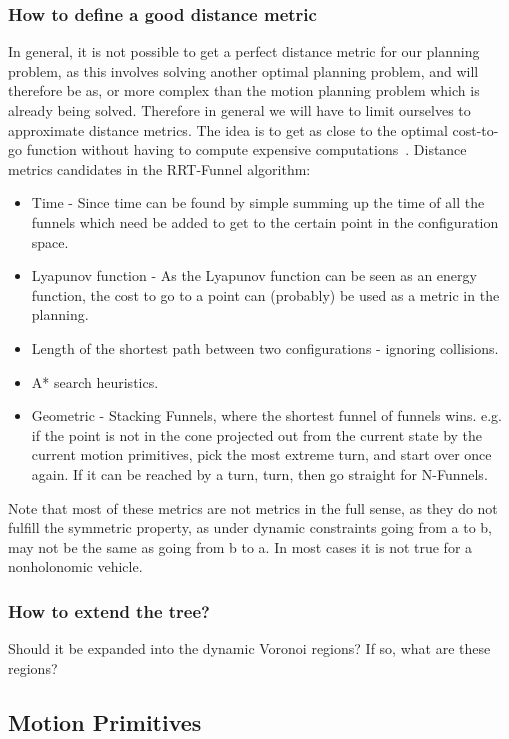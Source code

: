 \subsubsection{How to define a good distance metric}
In general, it is not possible to get a perfect distance metric for our planning
problem, as this involves solving another optimal planning problem, and will
therefore be as, or more complex than the motion planning problem which is
already being solved. Therefore in general we will have to limit ourselves to
approximate distance metrics. The idea is to get as close to the optimal
cost-to-go function without having to compute expensive computations~\cite{LaValle09}.
Distance metrics candidates in the RRT-Funnel algorithm:
\begin{itemize}
  \item Time - Since time can be found by simple summing up the time of all the
    funnels which need be added to get to the certain point in the configuration space.
  \item Lyapunov function - As the Lyapunov function can be seen as an energy
    function, the cost to go to a point can (probably) be used as a metric in
    the planning.
  \item Length of the shortest path between two configurations - ignoring collisions.
  \item A* search heuristics.
  \item Geometric - Stacking Funnels, where the shortest funnel of funnels wins.
    e.g. if the point is not in the cone projected out from the current state by
    the current motion primitives, pick the most extreme turn, and start over
    once again. If it can be reached by a turn, turn, then go straight for N-Funnels.
\end{itemize}

Note that most of these metrics are not metrics in the full sense, as they do
not fulfill the symmetric property, as under dynamic constraints going from a to
b, may not be the same as going from b to a. In most cases it is not true for a
nonholonomic vehicle.

\subsubsection{How to extend the tree?}

Should it be expanded into the dynamic Voronoi regions? If so, what are these regions?


\subsection{Motion Primitives}

